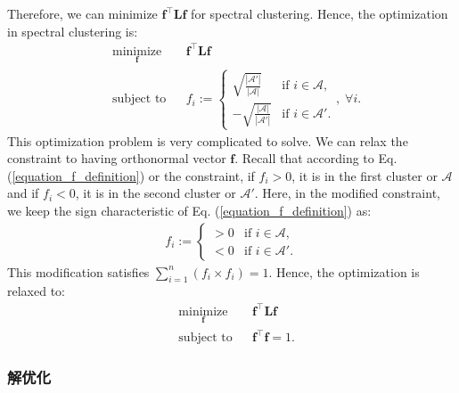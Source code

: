 \documentclass[lang=cn,10pt]{gorgeousnbook}
\numberwithin{equation}{section}%
\numberwithin{figure}{section}%
\begin{document}
Therefore, we can minimize $\boldsymbol{f}^\top \boldsymbol{L} \boldsymbol{f}$ for spectral clustering. Hence, the optimization in spectral clustering is:
\begin{equation}
\begin{aligned}
& \underset{\boldsymbol{f}}{\text{minimize}}
& & \boldsymbol{f}^\top \boldsymbol{L} \boldsymbol{f} \\
& \text{subject to}
& & 
f_i := 
\left\{
    \begin{array}{ll}
        \sqrt{\frac{|\mathcal{A}'|}{|\mathcal{A}|}} & \mbox{if } i \in \mathcal{A}, \\
        -\sqrt{\frac{|\mathcal{A}|}{|\mathcal{A}'|}} & \mbox{if } i \in \mathcal{A}'.
    \end{array}
\right.
, \; \forall i.
\end{aligned}
\end{equation}
This optimization problem is very complicated to solve. We can relax the constraint to having orthonormal vector $\boldsymbol{f}$.
Recall that according to Eq. (\ref{equation_f_definition}) or the constraint, if $f_i > 0$, it is in the first cluster or $\mathcal{A}$ and if $f_i < 0$, it is in the second cluster or $\mathcal{A}'$. 
Here, in the modified constraint, we keep the sign characteristic of Eq. (\ref{equation_f_definition}) as:
\begin{align}\label{equation_f_definition_sign}
f_i := 
\left\{
    \begin{array}{ll}
        > 0 & \mbox{if } i \in \mathcal{A}, \\
        < 0 & \mbox{if } i \in \mathcal{A}'.
    \end{array}
\right.
\end{align}
This modification satisfies $\sum_{i=1}^n (f_i \times f_i) = 1$.
Hence, the optimization is relaxed to:
\begin{equation}\label{equation_spectral_clustering_optimization}
\begin{aligned}
& \underset{\boldsymbol{f}}{\text{minimize}}
& & \boldsymbol{f}^\top \boldsymbol{L} \boldsymbol{f} \\
& \text{subject to}
& & 
\boldsymbol{f}^\top \boldsymbol{f} = 1.
\end{aligned}
\end{equation}

\subsubsection{解优化}
\end{document}
